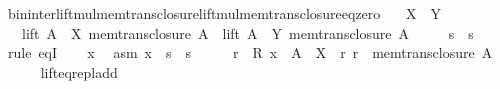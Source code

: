 \begin{isabellebody}
%
\endisatagproof
{\isafoldproof}%
%
\isadelimproof
\isanewline
%
\endisadelimproof
\isanewline
{}\isamarkupfalse%
\ bin{\isacharunderscore}{\kern0pt}inter{\isacharunderscore}{\kern0pt}lift{\isacharunderscore}{\kern0pt}mul{\isacharunderscore}{\kern0pt}mem{\isacharunderscore}{\kern0pt}trans{\isacharunderscore}{\kern0pt}closure{\isacharunderscore}{\kern0pt}lift{\isacharunderscore}{\kern0pt}mul{\isacharunderscore}{\kern0pt}mem{\isacharunderscore}{\kern0pt}trans{\isacharunderscore}{\kern0pt}closure{\isacharunderscore}{\kern0pt}eq{\isacharunderscore}{\kern0pt}zero{\isacharcolon}{\kern0pt}\isanewline
\ \ \ {\isachardoublequoteopen}X\ {\isasymnoteq}\ Y{\isachardoublequoteclose}\isanewline
\ \ \ {\isachardoublequoteopen}lift\ {\isacharparenleft}{\kern0pt}A\ {\isacharasterisk}{\kern0pt}\ X{\isacharparenright}{\kern0pt}\ {\isacharparenleft}{\kern0pt}mem{\isacharunderscore}{\kern0pt}trans{\isacharunderscore}{\kern0pt}closure\ A{\isacharparenright}{\kern0pt}\ {\isasyminter}\ lift\ {\isacharparenleft}{\kern0pt}A\ {\isacharasterisk}{\kern0pt}\ Y{\isacharparenright}{\kern0pt}\ {\isacharparenleft}{\kern0pt}mem{\isacharunderscore}{\kern0pt}trans{\isacharunderscore}{\kern0pt}closure\ A{\isacharparenright}{\kern0pt}\ {\isacharequal}{\kern0pt}\ {}{\isachardoublequoteclose}\isanewline
\ \ {\isacharparenleft}{\kern0pt}\ {\isachardoublequoteopen}{\isacharquery}{\kern0pt}s{}\ {\isasyminter}\ {\isacharquery}{\kern0pt}s{}\ {\isacharequal}{\kern0pt}\ {}{\isachardoublequoteclose}{\isacharparenright}{\kern0pt}\isanewline
%
\isadelimproof
%
\endisadelimproof
%
\isatagproof
{}\isamarkupfalse%
\ {\isacharparenleft}{\kern0pt}rule\ eqI{\isacharparenright}{\kern0pt}\isanewline
\ \ \isamarkupfalse%
\ x\ \isamarkupfalse%
\ asm{\isacharcolon}{\kern0pt}\ {\isachardoublequoteopen}x\ {\isasymin}\ {\isacharquery}{\kern0pt}s{}\ {\isasyminter}\ {\isacharquery}{\kern0pt}s{}{\isachardoublequoteclose}\isanewline
\ \ \isamarkupfalse%
\ \isamarkupfalse%
\ r\ \ R{\isacharcolon}{\kern0pt}\ {\isachardoublequoteopen}x\ {\isacharequal}{\kern0pt}\ A\ {\isacharasterisk}{\kern0pt}\ X\ {\isacharplus}{\kern0pt}\ r{\isachardoublequoteclose}\ {\isachardoublequoteopen}r\ {\isasymin}\ mem{\isacharunderscore}{\kern0pt}trans{\isacharunderscore}{\kern0pt}closure\ A{\isachardoublequoteclose}\isanewline
\ \ \ \ \isamarkupfalse%
\ lift{\isacharunderscore}{\kern0pt}eq{\isacharunderscore}{\kern0pt}repl{\isacharunderscore}{\kern0pt}add\ \isamarkupfalse%

\end{isabellebody}
